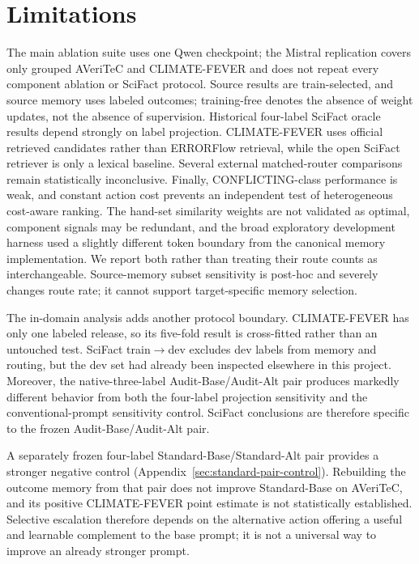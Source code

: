 \documentclass[runningheads]{llncs}
\begin{document}
\section{Limitations}

The main ablation suite uses one Qwen checkpoint; the Mistral replication
covers only grouped AVeriTeC and CLIMATE-FEVER and does not repeat every
component ablation or SciFact protocol. Source results are train-selected,
and source memory uses labeled outcomes; training-free denotes
the absence of weight updates, not the absence of supervision. Historical
four-label SciFact oracle results depend strongly on label projection.
CLIMATE-FEVER uses official
retrieved candidates rather than ERRORFlow retrieval, while the open SciFact
retriever is only a lexical baseline. Several external matched-router
comparisons remain statistically inconclusive. Finally, CONFLICTING-class
performance is weak, and constant action cost prevents an independent test of
heterogeneous cost-aware ranking. The hand-set similarity weights are not
validated as optimal, component signals may be redundant, and the broad
exploratory development harness used a slightly different token boundary from the
canonical memory implementation. We report both rather than treating their
route counts as interchangeable. Source-memory subset sensitivity is post-hoc
and severely changes route rate; it cannot support target-specific memory
selection.

The in-domain analysis adds another protocol boundary. CLIMATE-FEVER has only
one labeled release, so its five-fold result is cross-fitted rather than an
untouched test. SciFact train$\rightarrow$dev excludes dev labels from memory
and routing, but the dev set had already been inspected elsewhere in this
project. Moreover, the native-three-label Audit-Base/Audit-Alt pair produces markedly
different behavior from both the four-label projection sensitivity and the
conventional-prompt sensitivity control. SciFact conclusions are therefore
specific to the frozen Audit-Base/Audit-Alt pair.

A separately frozen four-label Standard-Base/Standard-Alt pair provides a stronger
negative control (Appendix~\ref{sec:standard-pair-control}). Rebuilding the
outcome memory from that pair does not improve Standard-Base on AVeriTeC, and
its positive CLIMATE-FEVER point estimate is not statistically established.
Selective escalation therefore depends on the alternative action offering a
useful and learnable complement to the base prompt; it is not a universal way to
improve an already stronger prompt.
\end{document}
